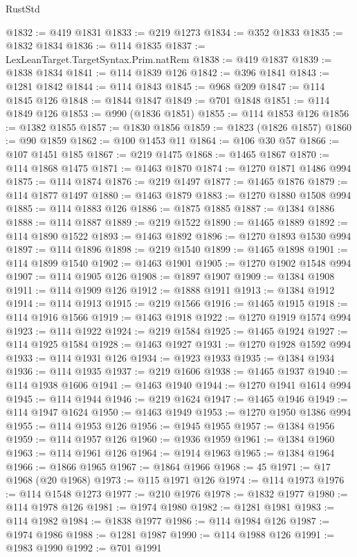 \begin{lexlean}{RustStd}
\begin{coremodule}
{\begin{coremodule}
{{{{{{{{{{{{{{{{{{{{{{{{{{{{{{{{{{{{{{{{{{{{{{{{{{@1832 := @419 @1831
@1833 := @219 @1273
@1834 := @352 @1833
@1835 := @1832 @1834
@1836 := @114 @1835
@1837 := LexLeanTarget.TargetSyntax.Prim.natRem
@1838 := @419 @1837
@1839 := @1838 @1834
@1841 := @114 @1839 @126
@1842 := @396 @1841
@1843 := @1281 @1842
@1844 := @114 @1843
@1845 := @968 @209
@1847 := @114 @1845 @126
@1848 := @1844 @1847
@1849 := @701 @1848
@1851 := @114 @1849 @126
@1853 := @990 (@1836 @1851)
@1855 := @114 @1853 @126
@1856 := @1382 @1855
@1857 := @1830 @1856
@1859 := @1823 (@1826 @1857)
@1860 := @90 @1859
@1862 := @100 @1453 @11
@1864 := @106 @30 @57
@1866 := @107 @1451 @185
@1867 := @219 @1475
@1868 := @1465 @1867
@1870 := @114 @1868 @1475
@1871 := @1463 @1870
@1874 := @1270 @1871 @1486 @994
@1875 := @114 @1874
@1876 := @219 @1497
@1877 := @1465 @1876
@1879 := @114 @1877 @1497
@1880 := @1463 @1879
@1883 := @1270 @1880 @1508 @994
@1885 := @114 @1883 @126
@1886 := @1875 @1885
@1887 := @1384 @1886
@1888 := @114 @1887
@1889 := @219 @1522
@1890 := @1465 @1889
@1892 := @114 @1890 @1522
@1893 := @1463 @1892
@1896 := @1270 @1893 @1530 @994
@1897 := @114 @1896
@1898 := @219 @1540
@1899 := @1465 @1898
@1901 := @114 @1899 @1540
@1902 := @1463 @1901
@1905 := @1270 @1902 @1548 @994
@1907 := @114 @1905 @126
@1908 := @1897 @1907
@1909 := @1384 @1908
@1911 := @114 @1909 @126
@1912 := @1888 @1911
@1913 := @1384 @1912
@1914 := @114 @1913
@1915 := @219 @1566
@1916 := @1465 @1915
@1918 := @114 @1916 @1566
@1919 := @1463 @1918
@1922 := @1270 @1919 @1574 @994
@1923 := @114 @1922
@1924 := @219 @1584
@1925 := @1465 @1924
@1927 := @114 @1925 @1584
@1928 := @1463 @1927
@1931 := @1270 @1928 @1592 @994
@1933 := @114 @1931 @126
@1934 := @1923 @1933
@1935 := @1384 @1934
@1936 := @114 @1935
@1937 := @219 @1606
@1938 := @1465 @1937
@1940 := @114 @1938 @1606
@1941 := @1463 @1940
@1944 := @1270 @1941 @1614 @994
@1945 := @114 @1944
@1946 := @219 @1624
@1947 := @1465 @1946
@1949 := @114 @1947 @1624
@1950 := @1463 @1949
@1953 := @1270 @1950 @1386 @994
@1955 := @114 @1953 @126
@1956 := @1945 @1955
@1957 := @1384 @1956
@1959 := @114 @1957 @126
@1960 := @1936 @1959
@1961 := @1384 @1960
@1963 := @114 @1961 @126
@1964 := @1914 @1963
@1965 := @1384 @1964
@1966 := @1866 @1965
@1967 := @1864 @1966
@1968 := 45
@1971 := @17 @1968 (@20 @1968)
@1973 := @115 @1971 @126
@1974 := @114 @1973
@1976 := @114 @1548 @1273
@1977 := @210 @1976
@1978 := @1832 @1977
@1980 := @114 @1978 @126
@1981 := @1974 @1980
@1982 := @1281 @1981
@1983 := @114 @1982
@1984 := @1838 @1977
@1986 := @114 @1984 @126
@1987 := @1974 @1986
@1988 := @1281 @1987
@1990 := @114 @1988 @126
@1991 := @1983 @1990
@1992 := @701 @1991
}}}}}}}}}}}}}}}}}}}}}}}}}}}}}}}}}}}}}}}}}}}}}}}}}}
\end{coremodule}}
\end{coremodule}
\end{lexlean}
